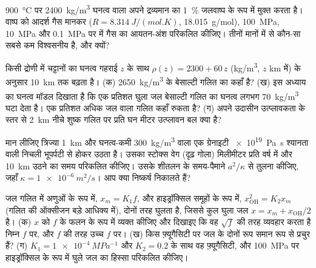 \begin{exercise}[$\star\star$]\label{exo:b2:magma-emplacement:7}
\qty{900}{\celsius} पर \qty{2400}{kg/m^3} घनत्व वाला  अपने द्रव्यमान का
\qty{1}{\percent} जलवाष्प के रूप में मुक्त करता है। वाष्प को आदर्श गैस मानकर
($R = \qty{8.314}{J/(mol.K)}$, \qty{18.015}{g/mol}), \qty{100}{MPa}, \qty{10}{MPa} और \qty{0.1}{MPa} पर  में
गैस का आयतन-अंश परिकलित कीजिए। तीनों मानों में से
कौन-सा सबसे कम विश्वसनीय है, और क्यों?
\end{exercise}

\begin{exercise}[$\star\star$]\label{exo:b2:magma-emplacement:8}
किसी द्रोणी में चट्टानों का घनत्व गहराई $z$ के साथ $\rho(z) =
2300 + 60\,z$ (\unit{kg/m^3}, $z$ \unit{km} में) के अनुसार \qty{10}{km} तक बढ़ता है। (क)
\qty{2650}{kg/m^3} के बेसाल्टी गलित का  कहाँ है? (ख) इस अध्याय का
घनत्व मॉडल दिखाता है कि एक प्रतिशत घुला जल बेसाल्टी गलित का घनत्व
लगभग \qty{70}{kg/m^3} घटा देता है। एक प्रतिशत अधिक जल वाला गलित कहाँ
रुकता है? (ग) अपने उदासीन उत्प्लावकता के स्तर से \qty{2}{km} नीचे शुष्क गलित पर
प्रति घन मीटर उत्प्लावन बल क्या है?
\end{exercise}

\begin{exercise}[$\star\star$]\label{exo:b2:magma-emplacement:9}
मान लीजिए त्रिज्या \qty{1}{km} और घनत्व-कमी \qty{300}{kg/m^3} वाला एक ग्रेनाइटी 
\qty{e19}{Pa.s} श्यानता वाली निचली भूपर्पटी से होकर उठता है। उसका
स्टोक्स वेग (दृढ़ गोला) मिलीमीटर प्रति वर्ष में और \qty{10}{km} उठने का समय परिकलित कीजिए।
उसके शीतलन के समय-पैमाने $a^2/\kappa$ से तुलना कीजिए, जहाँ $\kappa
= \qty{1e-6}{m^2/s}$। आप क्या निष्कर्ष निकालते हैं?
\end{exercise}

\begin{exercise}[$\star\star\star$]\label{exo:b2:magma-emplacement:10}
जल गलित में अणुओं के रूप में, $x_m = K_1 f$, और हाइड्रॉक्सिल
समूहों के रूप में, $x_{\mathrm{OH}}^2 = K_2 x_m$ (गलित की ऑक्सीजन बड़े आधिक्य में), दोनों तरह घुलता है, जिससे
कुल घुला जल $x = x_m + x_{\mathrm{OH}}/2$ है। (क) $x$ को
$f$ के फलन के रूप में व्यक्त कीजिए और दिखाइए कि वह $\sqrt f$ की तरह व्यवहार करता है निम्न $f$ पर,
और $f$ की तरह उच्च $f$ पर। (ख) किस फ़्यूगैसिटी पर जल के दोनों रूप समान रूप से प्रचुर हैं? (ग)
$K_1 = \qty{1e-4}{MPa^{-1}}$ और $K_2 = 0.2$ के साथ वह फ़्यूगैसिटी, और \qty{100}{MPa} पर हाइड्रॉक्सिल के रूप में
घुले जल का हिस्सा परिकलित कीजिए।
\end{exercise}

